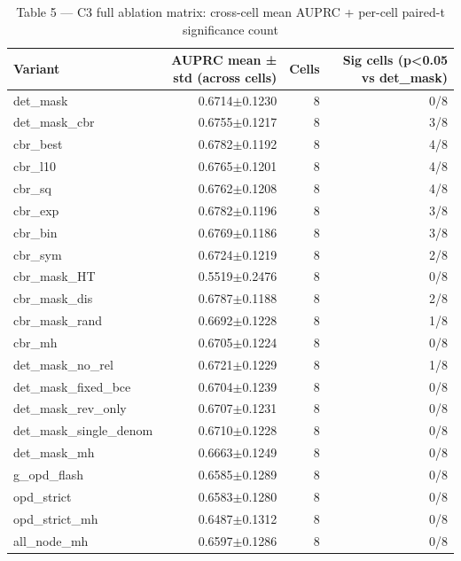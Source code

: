 \begin{table}[ht]
\centering
\caption{Table 5 — C3 full ablation matrix: cross-cell mean AUPRC + per-cell paired-t significance count}
\small
\begin{tabular}{lrrr}
\toprule
Variant & AUPRC mean ± std (across cells) & Cells & Sig cells (p<0.05 vs det_mask) \\
\midrule
det_mask & 0.6714$\pm$0.1230 & 8 & 0/8 \\
det_mask_cbr & 0.6755$\pm$0.1217 & 8 & 3/8 \\
cbr_best & 0.6782$\pm$0.1192 & 8 & 4/8 \\
cbr_l10 & 0.6765$\pm$0.1201 & 8 & 4/8 \\
cbr_sq & 0.6762$\pm$0.1208 & 8 & 4/8 \\
cbr_exp & 0.6782$\pm$0.1196 & 8 & 3/8 \\
cbr_bin & 0.6769$\pm$0.1186 & 8 & 3/8 \\
cbr_sym & 0.6724$\pm$0.1219 & 8 & 2/8 \\
cbr_mask_HT & 0.5519$\pm$0.2476 & 8 & 0/8 \\
cbr_mask_dis & 0.6787$\pm$0.1188 & 8 & 2/8 \\
cbr_mask_rand & 0.6692$\pm$0.1228 & 8 & 1/8 \\
cbr_mh & 0.6705$\pm$0.1224 & 8 & 0/8 \\
det_mask_no_rel & 0.6721$\pm$0.1229 & 8 & 1/8 \\
det_mask_fixed_bce & 0.6704$\pm$0.1239 & 8 & 0/8 \\
det_mask_rev_only & 0.6707$\pm$0.1231 & 8 & 0/8 \\
det_mask_single_denom & 0.6710$\pm$0.1228 & 8 & 0/8 \\
det_mask_mh & 0.6663$\pm$0.1249 & 8 & 0/8 \\
g_opd_flash & 0.6585$\pm$0.1289 & 8 & 0/8 \\
opd_strict & 0.6583$\pm$0.1280 & 8 & 0/8 \\
opd_strict_mh & 0.6487$\pm$0.1312 & 8 & 0/8 \\
all_node_mh & 0.6597$\pm$0.1286 & 8 & 0/8 \\
\bottomrule
\end{tabular}
\end{table}
